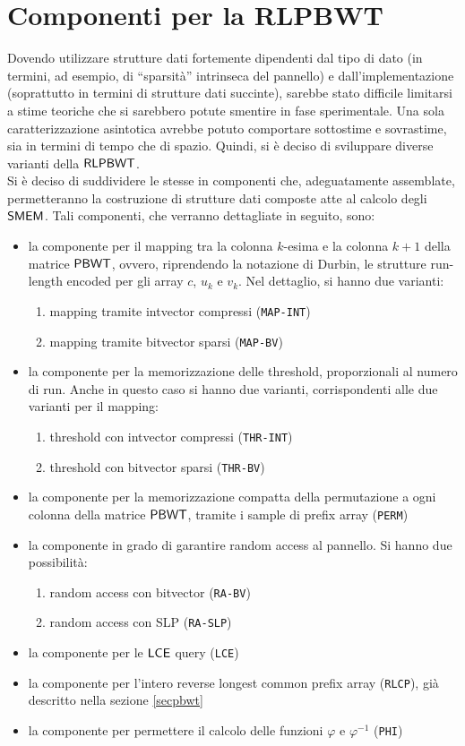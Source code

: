 \section{Componenti per la RLPBWT}
\label{sec:comp}
Dovendo utilizzare
strutture dati fortemente dipendenti dal tipo di dato (in termini, ad esempio,
di ``sparsità'' intrinseca del pannello) e dall'implementazione (soprattutto in
termini di strutture dati succinte), sarebbe stato difficile limitarsi a stime
teoriche che si sarebbero potute smentire in fase sperimentale. Una
sola caratterizzazione asintotica avrebbe potuto comportare sottostime e
sovrastime, sia in termini di tempo che di spazio. Quindi, si è deciso di
sviluppare diverse varianti della $\mbox{\rm {\sf RLPBWT}}$.\\
Si è deciso di
suddividere le stesse in componenti che, adeguatamente
assemblate, permetteranno la costruzione di strutture dati composte atte al
calcolo degli $\mbox{\rm {\sf SMEM}}$. Tali componenti, che verranno dettagliate in seguito,
sono: 
\begin{itemize}
  \item la componente per il mapping tra la colonna $k$-esima e la colonna
  $k+1$ della matrice $\mbox{\rm {\sf PBWT}}$, ovvero, riprendendo la notazione di Durbin, le
  strutture run-length 
  encoded per gli array $c$, $u_k$ e $v_k$. Nel dettaglio, si hanno due
  varianti: 
  \begin{enumerate}
    \item mapping tramite intvector compressi (\texttt{MAP-INT})
    \item mapping tramite bitvector sparsi (\texttt{MAP-BV})
  \end{enumerate}
  \item la componente per la memorizzazione delle threshold, 
  proporzionali al numero di run. Anche in questo caso si hanno due varianti,
  corrispondenti alle due varianti per il mapping:
  \begin{enumerate}
    \item threshold con intvector compressi (\texttt{THR-INT})
    \item threshold con bitvector sparsi (\texttt{THR-BV})
  \end{enumerate}
  \item la componente per la memorizzazione compatta della permutazione a ogni
  colonna 
  della matrice $\mbox{\rm {\sf PBWT}}$, tramite i sample di prefix array
  (\texttt{PERM}) 
  \item la componente in grado di garantire random access al
  pannello. Si hanno due possibilità:
  \begin{enumerate}
    \item random access con bitvector (\texttt{RA-BV})
    \item random access con SLP (\texttt{RA-SLP})
  \end{enumerate}
  \item la componente per le $\mbox{\rm {\sf LCE}}$ query
  (\texttt{LCE}) 
  \item la componente per l'intero reverse longest common prefix array
  (\texttt{RLCP}), già descritto nella sezione \ref{secpbwt}
  \item la componente per permettere il calcolo delle funzioni
  $\varphi$ e $\varphi^{-1}$ (\texttt{PHI})
\end{itemize}


